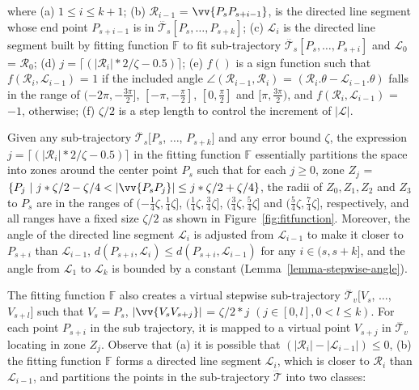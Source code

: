 \ni where (a) $1 \le i \le k+1$; (b) $\mathcal{R}_{i-1}$ = $\vv{P_sP_{s+i-1}}$, is the directed line segment whose end point $P_{s+i-1}$ is in $\dddot{\mathcal{T}_s}[P_s, \ldots, P_{s+k}]$; (c) $\mathcal{L}_{i}$ is the directed line segment built by fitting function $\mathbb{F}$ to fit sub-trajectory $\dddot{\mathcal{T}_s}[P_s, \ldots, P_{s+i}]$ and $\mathcal{L}_{0}$ = $\mathcal{R}_{0}$; (d) $j = \lceil(|\mathcal{R}_{i}|*2/\zeta - 0.5)\rceil$; (e) $f()$ is a sign function such that $ f(\mathcal{R}_i,\mathcal{L}_{i-1})$ = $1$ if the included angle $\angle(\mathcal{R}_{i-1}, \mathcal{R}_{i})$ = $(\mathcal{R}_i.\theta - \mathcal{L}_{i-1}.\theta)$ falls in the range of $(-2\pi, -\frac{3\pi}{2}]$, $[-\pi, -\frac{\pi}{2}]$, $[0, \frac{\pi}{2}]$ and $[\pi, \frac{3\pi}{2})$, and $f(\mathcal{R}_i,\mathcal{L}_{i-1})$ = $-1$, otherwise; (f) $\zeta/2$ is a step length to control the increment of $|\mathcal{L}|$.

Given any sub-trajectory $\dddot{\mathcal{T}_s}[P_s$, $\ldots$, $P_{s+k}]$ and any error bound $\zeta$, the expression $j = \lceil(|\mathcal{R}_{i}|*2/\zeta - 0.5)\rceil$ in the fitting function $\mathbb{F}$ essentially partitions the space into zones around the center point $P_s$ such that for each $j\ge 0$, zone $Z_j$ = $\{P_j \ |\ j*\zeta/2-\zeta/4 < |\vv{P_sP_j}|\le j*\zeta/2+\zeta/4\}$, \ie the radii of $Z_0, Z_1, Z_2$ and $Z_3$ to $P_s$ are in the ranges of $(-\frac{1}{4}\zeta, \frac{1}{4}\zeta]$, $(\frac{1}{4}\zeta, \frac{3}{4}\zeta]$, $(\frac{3}{4}\zeta, \frac{5}{4}\zeta]$ and $(\frac{5}{4}\zeta, \frac{7}{4}\zeta]$, respectively, and all ranges have a fixed size $\zeta/2$ as shown in Figure~\ref{fig:fitfunction}. Moreover, the angle of the  directed line segment $\mathcal{L}_i$ is adjusted from $\mathcal{L}_{i-1}$ to make it closer to $P_{s+i}$ than $\mathcal{L}_{i-1}$, \ie $d(P_{s+i}, \mathcal{L}_{i}) \le d(P_{s+i}, \mathcal{L}_{i-1})$ for any $i \in (s, s+k]$, and the angle from $\mathcal{L}_{1}$ to $\mathcal{L}_{k}$ is bounded by a constant (Lemma~\ref{lemma-stepwise-angle}).



The fitting function $\mathbb{F}$ also creates a virtual stepwise sub-trajectory $\dddot{\mathcal{T}_v}[V_s$, $\ldots$, $V_{s+l}]$ such that $V_s = P_s$, $|\vv{V_sV_{s+j}}|$ = $\zeta/2*j$ $(j\in[0,l], 0<l\le k)$.
For each point $P_{s+i}$ in the sub trajectory, it is mapped to a virtual point $V_{s+j}$ in $\dddot{\mathcal{T}_v}$ locating in zone $Z_j$.
%
Observe that (a) it is possible that $(|\mathcal{R}_{i}| - |\mathcal{L}_{i-1}|) \le 0$, (b) the fitting function  $\mathbb{F}$ forms a directed line segment $\mathcal{L}_i$, which is closer to $\mathcal{R}_i$ than $\mathcal{L}_{i-1}$, and partitions the points in the sub-trajectory $\dddot{\mathcal{T}}$ into two classes:


